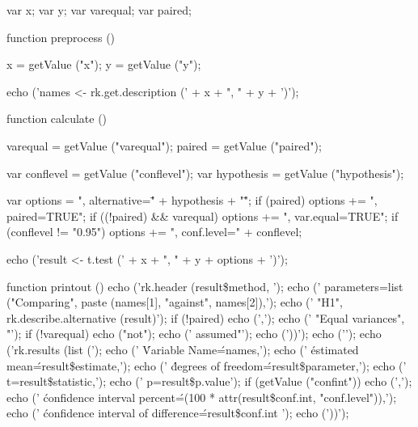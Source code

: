\begin{footnotesize}
\begin{Code}
var x;
var y;
var varequal;
var paired;

function preprocess () {
  x = getValue ("x");
  y = getValue ("y");

  echo ('names <- rk.get.description (' + x + ", " + y + ')\n');
}

function calculate () {
  varequal = getValue ("varequal");
  paired = getValue ("paired");

  var conflevel = getValue ("conflevel");
  var hypothesis = getValue ("hypothesis");

  var options = ", alternative=\"" + hypothesis + "\"";
  if (paired) options += ", paired=TRUE";
  if ((!paired) && varequal) options += ", var.equal=TRUE";
  if (conflevel != "0.95") options += ", conf.level=" + conflevel;

  echo ('result <- t.test (' + x + ", " + y + options + ')\n');
}

function printout () {
  echo ('rk.header (result\$method, \n');
  echo ('  parameters=list ("Comparing", paste (names[1], "against", names[2]),\n');
  echo ('  "H1", rk.describe.alternative (result)');
  if (!paired) {
    echo (',\n');
    echo ('  "Equal variances", "');
    if (!varequal) echo ("not");
    echo (' assumed"');
  }
  echo ('))\n');
  echo ('\n');
  echo ('rk.results (list (\n');
  echo ('  \'Variable Name\'=names,\n');
  echo ('  \'estimated mean\'=result\$estimate,\n');
  echo ('  \'degrees of freedom\'=result\$parameter,\n');
  echo ('  t=result\$statistic,\n');
  echo ('  p=result\$p.value');
  if (getValue ("confint")) {
    echo (',\n');
    echo ('  \'confidence interval percent\'=(100 * attr(result\$conf.int, "conf.level")),\n');
    echo ('  \'confidence interval of difference\'=result\$conf.int ');
  }
  echo ('))\n');
}
\end{Code}
\end{footnotesize}
